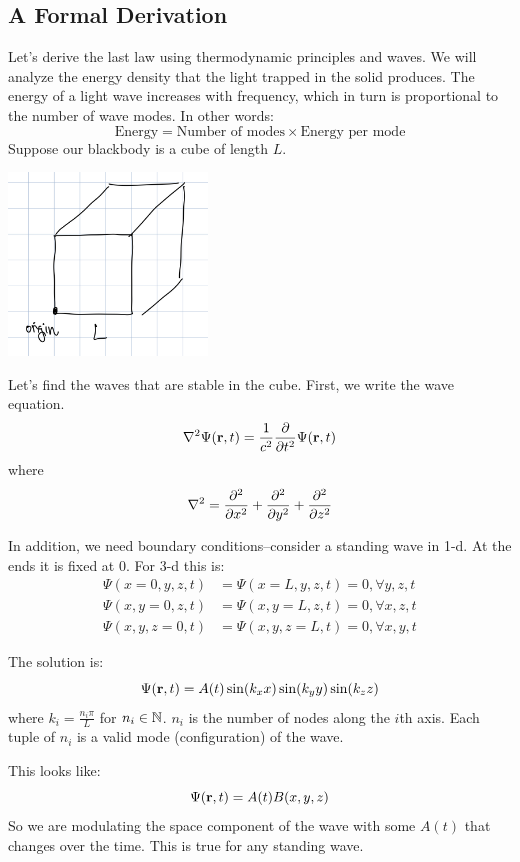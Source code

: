 \subsection{A Formal Derivation}

Let's derive the last law using thermodynamic principles and waves. We will analyze the energy density that the light trapped in the solid
produces. The energy of a light wave increases with frequency, which in turn is proportional to the number of wave modes. In other words:
\[ \text{Energy} = \text{Number of modes} \times \text{Energy per mode} \]
Suppose our blackbody is a cube of length $L$.
\begin{center}
    \includegraphics[width=200px]{../images/L_cube.jpeg}
\end{center}
Let's find the waves that are stable in the cube.
First, we write the wave equation.
\[ \nabla^2 \Psi(\mbf{r}, t) = \frac{1}{c^2} \partialderivative{}{t^2} \Psi(\mbf{r}, t) \]
where
\[ \nabla^2 = \partialderivative{^2}{x^2} + \partialderivative{^2}{y^2} + \partialderivative{^2}{z^2} \]

In addition, we need boundary conditions--consider a standing wave in 1-d. At the ends it is fixed at 0. For 3-d this is:
\begin{align*}
    \Psi(x = 0, y, z, t) &= \Psi(x = L, y, z, t) = 0, \forall y, z, t \\ 
    \Psi(x, y = 0, z, t) &= \Psi(x, y = L, z, t) = 0, \forall x, z, t \\
    \Psi(x, y, z = 0, t) &= \Psi(x, y, z = L, t) = 0, \forall x, y, t
\end{align*}

The solution is:
\[ \Psi(\mathbf{r}, t) = A(t) \sin(k_x x) \sin(k_y y) \sin(k_z z) \]
where $k_i = \frac{n_i \pi }{L}$ for $n_i \in \operatorname{\mathbb{N}}$. $n_i$ is the number of nodes along the $i$th axis. Each tuple of $n_i$ is a valid mode (configuration) of the wave.

This looks like:
\[ \Psi(\mathbf{r}, t) = A(t) B(x, y, z) \]
So we are modulating the space component of the wave with some $A(t)$ that changes over the time. This is true for any standing wave.